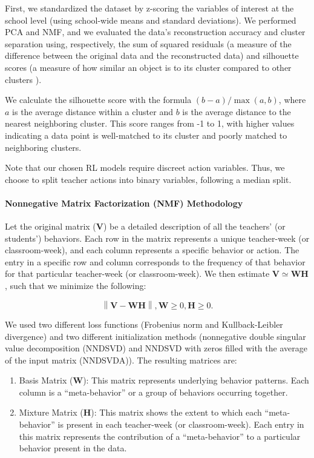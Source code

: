 \documentclass[
  number,
  preprint,
  3p,
  onecolumn]{elsarticle}
\let\oldparagraph\paragraph
\renewcommand{\paragraph}[1]{\oldparagraph{#1}\mbox{}}
\providecommand{\tightlist}{%
  \setlength{\itemsep}{0pt}\setlength{\parskip}{0pt}}\usepackage{longtable,booktabs,array}
\begin{document}
First, we standardized the dataset by z-scoring the variables of
interest at the school level (using school-wide means and standard
deviations). We performed PCA and NMF, and we evaluated the data's
reconstruction accuracy and cluster separation using, respectively, the
sum of squared residuals (a measure of the difference between the
original data and the reconstructed data) and silhouette scores (a
measure of how similar an object is to its cluster compared to other
clusters \citep{rousseeuw1987}).

We calculate the silhouette score with the formula
\((b - a) / \max(a, b)\), where \(a\) is the average distance within a
cluster and \(b\) is the average distance to the nearest neighboring
cluster. This score ranges from -1 to 1, with higher values indicating a
data point is well-matched to its cluster and poorly matched to
neighboring clusters.

Note that our chosen RL models require discreet action variables. Thus,
we choose to split teacher actions into binary variables, following a
median split.

\paragraph{Nonnegative Matrix Factorization (NMF)
Methodology}\label{nonnegative-matrix-factorization-nmf-methodology}

Let the original matrix (\(\mathbf{V}\)) be a detailed description of
all the teachers' (or students') behaviors. Each row in the matrix
represents a unique teacher-week (or classroom-week), and each column
represents a specific behavior or action. The entry in a specific row
and column corresponds to the frequency of that behavior for that
particular teacher-week (or classroom-week). We then estimate
\(\mathbf{V} \simeq \mathbf{W}\mathbf{H}\), such that we minimize the
following:

\[
\left\| \mathbf{V} - \mathbf{W}\mathbf{H} \right\| , \mathbf{W} \geq 0, \mathbf{H} \geq 0.
\]

We used two different loss functions (Frobenius norm and
Kullback-Leibler divergence) and two different initialization methods
(nonnegative double singular value decomposition (NNDSVD) and NNDSVD
with zeros filled with the average of the input matrix (NNDSVDA)). The
resulting matrices are:

\begin{enumerate}
\def\labelenumi{\arabic{enumi}.}
\tightlist
\item
  Basis Matrix (\(\mathbf{W}\)): This matrix represents underlying
  behavior patterns. Each column is a ``meta-behavior'' or a group of
  behaviors occurring together.
\item
  Mixture Matrix (\(\mathbf{H}\)): This matrix shows the extent to which
  each ``meta-behavior'' is present in each teacher-week (or
  classroom-week). Each entry in this matrix represents the contribution
  of a ``meta-behavior'' to a particular behavior present in the data.
\end{enumerate}
\end{document}
